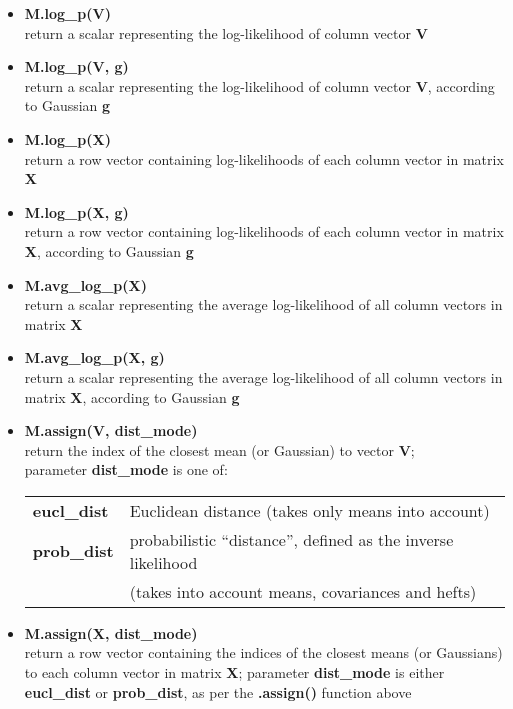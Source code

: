 \begin{small}
\begin{itemize}

\item
{\bf M.log\_p(V)}\\
return a scalar representing the log-likelihood of column vector {\bf V}


\item
{\bf M.log\_p(V, g)}\\
return a scalar representing the log-likelihood of column vector {\bf V}, according to Gaussian {\bf g}


\item
{\bf M.log\_p(X)}\\
return a row vector containing log-likelihoods of each column vector in matrix {\bf X}


\item
{\bf M.log\_p(X, g)}\\
return a row vector containing log-likelihoods of each column vector in matrix {\bf X}, according to Gaussian {\bf g}

\item
{\bf M.avg\_log\_p(X)}\\
return a scalar representing the average log-likelihood of all column vectors in matrix {\bf X}

\item
{\bf M.avg\_log\_p(X, g)}\\
return a scalar representing the average log-likelihood of all column vectors in matrix {\bf X}, according to Gaussian {\bf g}

\item
{\bf M.assign(V, dist\_mode)}\\
return the index of the closest mean (or Gaussian) to vector {\bf V};\\
parameter {\bf dist\_mode} is one of:

\begin{tabular}{ll}
{\bf eucl\_dist} & Euclidean distance (takes only means into account) \\
{\bf prob\_dist} & probabilistic ``distance'', defined as the inverse likelihood\\
                 & (takes into account means, covariances and hefts)
\end{tabular}

\item
{\bf M.assign(X, dist\_mode)}\\
return a row vector containing the indices of the closest means (or Gaussians) to each column vector in matrix {\bf X};
parameter {\bf dist\_mode} is either {\bf eucl\_dist} or {\bf prob\_dist}, as per the {\bf .assign()} function above


\end{itemize}
\end{small}
